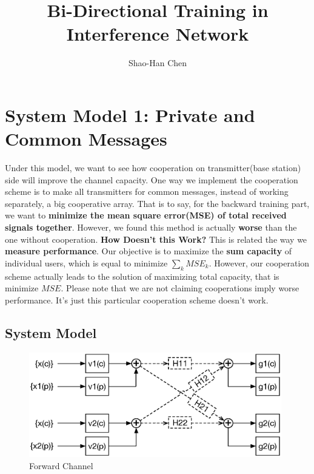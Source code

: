\documentclass[11pt, oneside]{article}   	%
\begin{document}
\title{Bi-Directional Training in Interference Network}

\author{Shao-Han Chen}


\maketitle
\tableofcontents


\section{System Model 1: Private and Common Messages}

Under this model, we want to see how cooperation on transmitter(base station) side will improve the channel capacity. One way we implement the cooperation scheme is to make all transmitters for common messages, instead of working separately, a big cooperative array. That is to say, for the backward training part, we want to \textbf{minimize the mean square error(MSE) of total received signals together}. However, we found this method is actually \textbf{worse} than the one without cooperation. \textbf{How Doesn't this Work?} This is related the way we \textbf{measure performance}. Our objective is to maximize the \textbf{sum capacity} of individual users, which is equal to minimize $\displaystyle\sum_{k} MSE_{k}$. However, our cooperation scheme actually leads to the solution of maximizing total capacity, that is minimize $MSE$. Please note that we are not claiming cooperations imply worse performance. It's just this particular cooperation scheme doesn't work. 
\subsection{System Model}

\begin{figure}[h]
    \centering
    \centerline{\includegraphics[width=110mm]{forward_channel}}
    \caption{Forward Channel}
\end{figure} 
\end{document}
